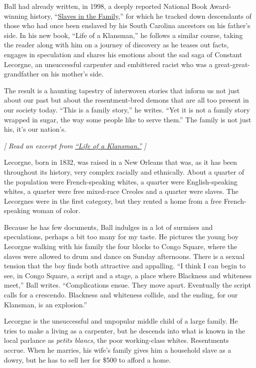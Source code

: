 Ball had already written, in 1998, a deeply reported National Book
Award-winning history,
``\href{https://www.nytimes3xbfgragh.onion/1998/03/01/books/skeletons-in-the-family-closet.html?searchResultPosition=1}{Slaves
in the Family},'' for which he tracked down descendants of those who had
once been enslaved by his South Carolina ancestors on his father's side.
In his new book, ``Life of a Klansman,'' he follows a similar course,
taking the reader along with him on a journey of discovery as he teases
out facts, engages in speculation and shares his emotions about the sad
saga of Constant Lecorgne, an unsuccessful carpenter and embittered
racist who was a great-great-grandfather on his mother's side.

The result is a haunting tapestry of interwoven stories that inform us
not just about our past but about the resentment-bred demons that are
all too present in our society today. ``This is a family story,'' he
writes. ``Yet it is not a family story wrapped in sugar, the way some
people like to serve them.'' The family is not just his, it's our
nation's.

\emph{{[} Read an excerpt from}
\href{https://www.nytimes3xbfgragh.onion/2020/08/04/books/review/life-of-a-klansman-by-edward-ball-an-excerpt.html}{\emph{``Life
of a Klansman.''}} \emph{{]}}

Lecorgne, born in 1832, was raised in a New Orleans that was, as it has
been throughout its history, very complex racially and ethnically. About
a quarter of the population were French-speaking whites, a quarter were
English-speaking whites, a quarter were free mixed-race Creoles and a
quarter were slaves. The Lecorgnes were in the first category, but they
rented a home from a free French-speaking woman of color.

Because he has few documents, Ball indulges in a lot of surmises and
speculations, perhaps a bit too many for my taste. He pictures the young
boy Lecorgne walking with his family the four blocks to Congo Square,
where the slaves were allowed to drum and dance on Sunday afternoons.
There is a sexual tension that the boy finds both attractive and
appalling. ``I think I can begin to see, in Congo Square, a script and a
stage, a place where Blackness and whiteness meet,'' Ball writes.
``Complications ensue. They move apart. Eventually the script calls for
a crescendo. Blackness and whiteness collide, and the ending, for our
Klansman, is an explosion.''

Lecorgne is the unsuccessful and unpopular middle child of a large
family. He tries to make a living as a carpenter, but he descends into
what is known in the local parlance as \emph{petits blancs}, the poor
working-class whites. Resentments accrue. When he marries, his wife's
family gives him a household slave as a dowry, but he has to sell her
for \$500 to afford a home.


